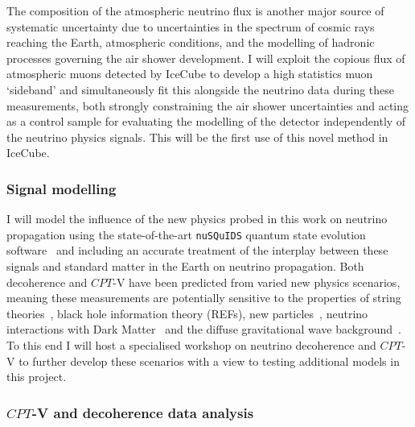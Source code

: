 \documentclass[a4paper,11pt]{article}
\begin{document}
The composition of the atmospheric neutrino flux is another major source of systematic uncertainty due to uncertainties in the spectrum of cosmic rays reaching the Earth, atmospheric conditions, and the modelling of hadronic processes governing the air shower development. I will exploit the copious flux of atmospheric muons detected by IceCube to develop a high statistics muon `sideband' and simultaneously fit this alongside the neutrino data during these measurements, both strongly constraining the air shower uncertainties and acting as a control sample for evaluating the modelling of the detector independently of the neutrino physics signals. This will be the first use of this novel method in IceCube. \\



\subsubsection{Signal modelling}

I will model the influence of the new physics probed in this work on neutrino propagation using the state-of-the-art \texttt{nuSQuIDS} quantum state evolution software~\cite{Delgado:2014kpa, nusquidsGIT} and including an accurate treatment of the interplay between these signals and standard matter in the Earth on neutrino propagation. Both decoherence and $CPT$-V have been predicted from varied new physics scenarios, meaning these measurements are potentially sensitive to the properties of string theories~\cite{Mavromatos2010, AmelinoCamelia:2008qg}, black hole information theory (REFs), new particles~\cite{Hellmann:2021jyz}, neutrino interactions with Dark Matter~\cite{1909.11271, EPJC802020, Capozzi:2018bps, 1904.02518} and the diffuse gravitational wave background~\cite{PhysRevD.100.096014}. To this end I will host a specialised workshop on neutrino decoherence and $CPT$-V to further develop these scenarios with a view to testing additional models in this project. \\

\subsubsection{$CPT$-V and decoherence data analysis}
\end{document}
